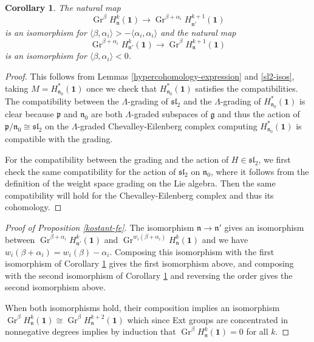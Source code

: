 \documentclass[11pt,letterpaper]{article}
\newtheorem{cor}[theorem]{Corollary}
\theoremstyle{definition}
\theoremstyle{remark}
\numberwithin{equation}{section}
\theoremstyle{dotless}
\newcommand{\Gr}{\operatorname{Gr}}
\newcommand{\LieH}{H}
\begin{document}
\begin{cor}\label{applied-sl2-isos} The natural map
\[ \Gr^\beta \LieH^{k}_{\mathfrak n} ( \mathbf 1)  \to   \Gr^{\beta+\alpha_i}\LieH^{k+1}_{\mathfrak n'} ( \mathbf 1) \]
is an isomorphism  for $\langle \beta, \alpha_i  \rangle > - \langle \alpha_i, \alpha_i \rangle $ and the natural map
\[ \Gr^{\beta+ \alpha_i}\LieH^{k}_{\mathfrak n'} ( \mathbf 1)  \to  \Gr^\beta  \LieH^{k+1}_{\mathfrak n} ( \mathbf 1)  \]
 is an isomorphism for $\langle \beta, \alpha_i \rangle < 0$.\end{cor}
 
 \begin{proof} This follows from Lemmas \ref{hypercohomology-expression} and  \ref{sl2-isos}, taking $M= \LieH^*_{\mathfrak n_0} ( \mathbf 1 )$ once we check that $\LieH^*_{\mathfrak n_0} ( \mathbf 1 )$ satisfies the compatibilities. The compatibility between the $\Lambda$-grading of $\mathfrak{sl}_2$ and the $\Lambda$-grading of $\LieH^*_{\mathfrak n_0} ( \mathbf 1 )$ is clear because $\mathfrak p$ and $\mathfrak n_0$ are both $\Lambda$-graded subspaces of $\mathfrak g$ and thus the action of $\mathfrak p/\mathfrak n_0 \cong \mathfrak{sl}_2$ on the $\Lambda$-graded Chevalley-Eilenberg complex computing $\LieH^*_{\mathfrak n_0} ( \mathbf 1 )$ is compatible with the grading. 
  
 
 
 For the compatibility between the grading and the action of $H \in \mathfrak {sl}_2$, we first check the same compatibility for the action of $\mathfrak {sl}_2$ on $\mathfrak n_0$, where it follows from the definition of the weight space grading on the Lie algebra.  Then the same compatibility will hold for the Chevalley-Eilenberg complex and thus its cohomology. \end{proof} 
 
 

\begin{proof}[Proof of Proposition \ref{kostant-fe}]  The isomorphism $\mathfrak n \to \mathfrak n'$ gives an isomorphism between  $ \Gr^{\beta+\alpha_i }\LieH^{k}_{\mathfrak n'} ( \mathbf 1)  $ and  $ \Gr^{w_i (\beta+\alpha_i )}\LieH^{k}_{\mathfrak n} ( \mathbf 1)  $ and we have $w_i(\beta+ \alpha_i) = w_i (\beta) -\alpha_i$. Composing this isomorphism with the first isomorphism of Corollary \ref{applied-sl2-isos} gives the first isomorphism above, and composing with the second isomorphism of Corollary \ref{applied-sl2-isos} and reversing the order gives the second isomorphism above.
 
 When both isomorphisms hold, their composition implies an isomorphism $ \Gr^\beta \LieH^{k}_{\mathfrak n} ( \mathbf 1)  \cong   \Gr^\beta \LieH^{k+2}_{\mathfrak n} ( \mathbf 1)  $ which since Ext groups are concentrated in nonnegative degrees implies by induction that $ \Gr^\beta \LieH^{k}_{\mathfrak n} ( \mathbf 1) =0$ for all $k$. \end{proof}
 
\end{document}
